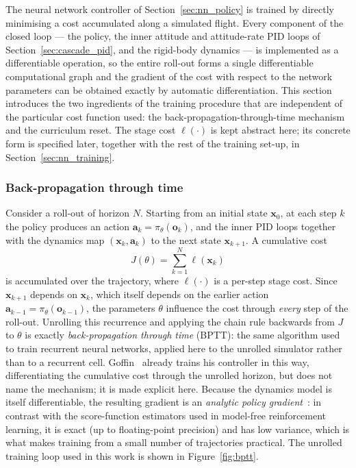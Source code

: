 \documentclass[11pt,a4paper]{article}
\theoremstyle{remark}
\numberwithin{equation}{section}
\begin{document}
The neural network controller of Section~\ref{sec:nn_policy} is trained by directly
minimising a cost accumulated along a simulated flight. Every component of the closed loop
--- the policy, the inner attitude and attitude-rate PID loops of
Section~\ref{sec:cascade_pid}, and the rigid-body dynamics --- is implemented as a
differentiable operation, so the entire roll-out forms a single differentiable
computational graph and the gradient of the cost with respect to the network parameters
can be obtained exactly by automatic differentiation. This section introduces the two
ingredients of the training procedure that are independent of the particular cost function
used: the back-propagation-through-time mechanism and the curriculum reset. The stage cost
$\ell(\cdot)$ is kept abstract here; its concrete form is specified later, together with
the rest of the training set-up, in Section~\ref{sec:nn_training}.

\subsubsection*{Back-propagation through time}

Consider a roll-out of horizon $N$. Starting from an initial state $\mathbf{x}_0$, at each
step $k$ the policy produces an action $\mathbf{a}_k = \pi_\theta(\mathbf{o}_k)$, and the
inner PID loops together with the dynamics map $(\mathbf{x}_k, \mathbf{a}_k)$ to the next
state $\mathbf{x}_{k+1}$. A cumulative cost
\begin{equation}
J(\theta) = \sum_{k=1}^{N} \ell(\mathbf{x}_k)
\label{eq:cumulative_cost}
\end{equation}
is accumulated over the trajectory, where $\ell(\cdot)$ is a per-step stage cost. Since
$\mathbf{x}_{k+1}$ depends on $\mathbf{x}_k$, which itself depends on the earlier action
$\mathbf{a}_{k-1} = \pi_\theta(\mathbf{o}_{k-1})$, the parameters $\theta$ influence the
cost through \emph{every} step of the roll-out. Unrolling this recurrence and applying the
chain rule backwards from $J$ to $\theta$ is exactly \emph{back-propagation through time}
(BPTT): the same algorithm used to train recurrent neural networks, applied here to the
unrolled simulator rather than to a recurrent cell. Goffin~\cite{goffin2026} already trains
his controller in this way, differentiating the cumulative cost through the unrolled
horizon, but does not name the mechanism; it is made explicit here.
Because the dynamics model is itself differentiable, the resulting gradient is an
\emph{analytic policy gradient}~\cite{wiedemann2023apg}: in contrast with the
score-function estimators used in model-free reinforcement learning, it is exact (up to
floating-point precision) and has low variance, which is what makes training from a small
number of trajectories practical. The unrolled training loop used in this work is shown in
Figure~\ref{fig:bptt}.
\end{document}
